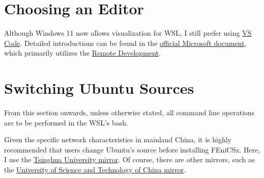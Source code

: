\documentclass{report}
\begin{document}
\section{Choosing an Editor}\label{sec:editor}

Although Windows 11 now allows visualization for WSL, I still prefer using \href{https://code.visualstudio.com/}{VS Code}. Detailed introductions can be found in the \href{https://learn.microsoft.com/zh-cn/windows/wsl/tutorials/wsl-vscode}{official Microsoft document}, which primarily utilizes the \href{https://marketplace.visualstudio.com/items?itemName=ms-vscode-remote.vscode-remote-extensionpack}{Remote Development}.

\section{Switching Ubuntu Sources}\label{sec:source}

From this section onwards, unless otherwise stated, all command line operations are to be performed in the WSL's \textsf{bash}.

Given the specific network characteristics in mainland China, it is highly recommended that users change Ubuntu's source before installing FEniCSx. Here, I use the \href{https://mirrors.tuna.tsinghua.edu.cn/help/ubuntu/}{Tsinghua University mirror}. Of course, there are other mirrors, such as the \href{https://mirrors.ustc.edu.cn/help/ubuntu.html}{University of Science and Technology of China mirror}.
\end{document}
